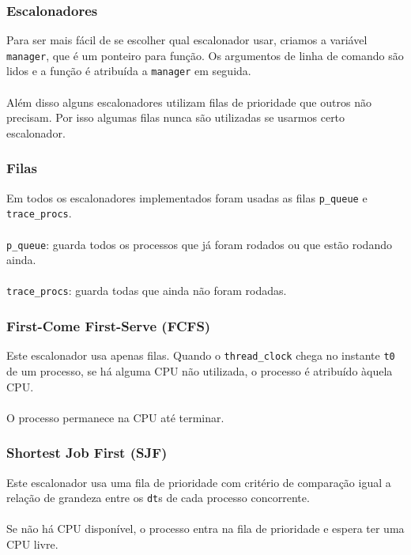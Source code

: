 \documentclass{beamer}
\begin{document}

\begin{frame}
  \frametitle{Escalonadores}
  Para ser mais fácil de se escolher qual escalonador usar, criamos a variável \texttt{manager}, que é um ponteiro para função. Os argumentos de linha de comando são lidos e a função é atribuída a \texttt{manager} em seguida. \\~\\

  Além disso alguns escalonadores utilizam filas de prioridade que outros não precisam. Por isso algumas filas nunca são utilizadas se usarmos certo escalonador.
\end{frame}


\begin{frame}
  \frametitle{Filas}
  Em todos os escalonadores implementados foram usadas as filas \texttt{p\_queue} e \texttt{trace\_procs}. \\~\\
  
  \texttt{p\_queue}: guarda todos os processos que já foram rodados ou que estão rodando ainda. \\~\\

  \texttt{trace\_procs}: guarda todas que ainda não foram rodadas.
\end{frame}


\begin{frame}
  \frametitle{First-Come First-Serve (FCFS)}
  Este escalonador usa apenas filas. Quando o \texttt{thread\_clock} chega no instante \texttt{t0} de um processo, se há alguma CPU não utilizada, o processo é atribuído àquela CPU. \\~\\

  O processo permanece na CPU até terminar.
\end{frame}


\begin{frame}
  \frametitle{Shortest Job First (SJF)}
  Este escalonador usa uma fila de prioridade com critério de comparação igual a relação de grandeza entre os \texttt{dt}s de cada processo concorrente. \\~\\

  Se não há CPU disponível, o processo entra na fila de prioridade e espera ter uma CPU livre.
\end{frame}
\end{document}

